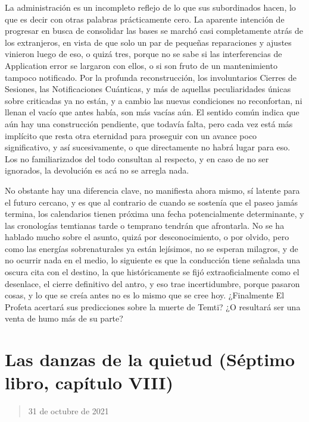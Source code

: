 \documentclass[
]{book}
\begin{document}
La administración es un incompleto reflejo de lo que sus subordinados hacen, lo que es decir con otras palabras prácticamente cero. La aparente intención de progresar en busca de consolidar las bases se marchó casi completamente atrás de los extranjeros, en vista de que solo un par de pequeñas reparaciones y ajustes vinieron luego de eso, o quizá tres, porque no se sabe si las interferencias de Application error se largaron con ellos, o si son fruto de un mantenimiento tampoco notificado. Por la profunda reconstrucción, los involuntarios Cierres de Sesiones, las Notificaciones Cuánticas, y más de aquellas peculiaridades únicas sobre criticadas ya no están, y a cambio las nuevas condiciones no reconfortan, ni llenan el vacío que antes había, son más vacías aún. El sentido común indica que aún hay una construcción pendiente, que todavía falta, pero cada vez está más implícito que resta otra eternidad para proseguir con un avance poco significativo, y así sucesivamente, o que directamente no habrá lugar para eso. Los no familiarizados del todo consultan al respecto, y en caso de no ser ignorados, la devolución es acá no se arregla nada.

No obstante hay una diferencia clave, no manifiesta ahora mismo, sí latente para el futuro cercano, y es que al contrario de cuando se sostenía que el paseo jamás termina, los calendarios tienen próxima una fecha potencialmente determinante, y las cronologías temtianas tarde o temprano tendrán que afrontarla. No se ha hablado mucho sobre el asunto, quizá por desconocimiento, o por olvido, pero como las energías sobrenaturales ya están lejísimos, no se esperan milagros, y de no ocurrir nada en el medio, lo siguiente es que la conducción tiene señalada una oscura cita con el destino, la que históricamente se fijó extraoficialmente como el desenlace, el cierre definitivo del antro, y eso trae incertidumbre, porque pasaron cosas, y lo que se creía antes no es lo mismo que se cree hoy. ¿Finalmente El Profeta acertará sus predicciones sobre la muerte de Temti? ¿O resultará ser una venta de humo más de su parte?

\hypertarget{las-danzas-de-la-quietud-suxe9ptimo-libro-capuxedtulo-viii}{%
\section{Las danzas de la quietud (Séptimo libro, capítulo VIII)}\label{las-danzas-de-la-quietud-suxe9ptimo-libro-capuxedtulo-viii}}

\begin{quote}
31 de octubre de 2021
\end{quote}
\end{document}
